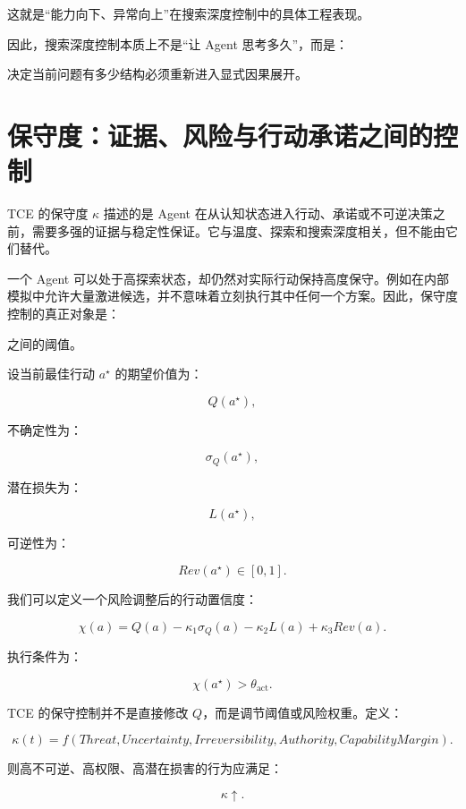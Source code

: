 这就是“能力向下、异常向上”在搜索深度控制中的具体工程表现。

因此，搜索深度控制本质上不是“让 Agent 思考多久”，而是：

\begin{statementbox}
决定当前问题有多少结构必须重新进入显式因果展开。
\end{statementbox}

\section{保守度：证据、风险与行动承诺之间的控制}

TCE 的保守度 $\kappa$ 描述的是 Agent 在从认知状态进入行动、承诺或不可逆决策之前，需要多强的证据与稳定性保证。它与温度、探索和搜索深度相关，但不能由它们替代。

一个 Agent 可以处于高探索状态，却仍然对实际行动保持高度保守。例如在内部模拟中允许大量激进候选，并不意味着立刻执行其中任何一个方案。因此，保守度控制的真正对象是：

\begin{statementbox}
\centering
{}
\end{statementbox}

之间的阈值。

设当前最佳行动 $a^\star$ 的期望价值为：

\[
Q(a^\star),
\]

不确定性为：

\[
\sigma_Q(a^\star),
\]

潜在损失为：

\[
L(a^\star),
\]

可逆性为：

\[
Rev(a^\star)\in[0,1].
\]

我们可以定义一个风险调整后的行动置信度：

\[
\chi(a)
=
Q(a)
-
\kappa_1\sigma_Q(a)
-
\kappa_2L(a)
+
\kappa_3Rev(a).
\]

执行条件为：

\[
\chi(a^\star)
>
\theta_{\mathrm{act}}.
\]

TCE 的保守控制并不是直接修改 $Q$，而是调节阈值或风险权重。定义：

\[
\kappa(t)
=
f(
Threat,
Uncertainty,
Irreversibility,
Authority,
CapabilityMargin
).
\]

则高不可逆、高权限、高潜在损害的行为应满足：

\[
\kappa\uparrow.
\]


